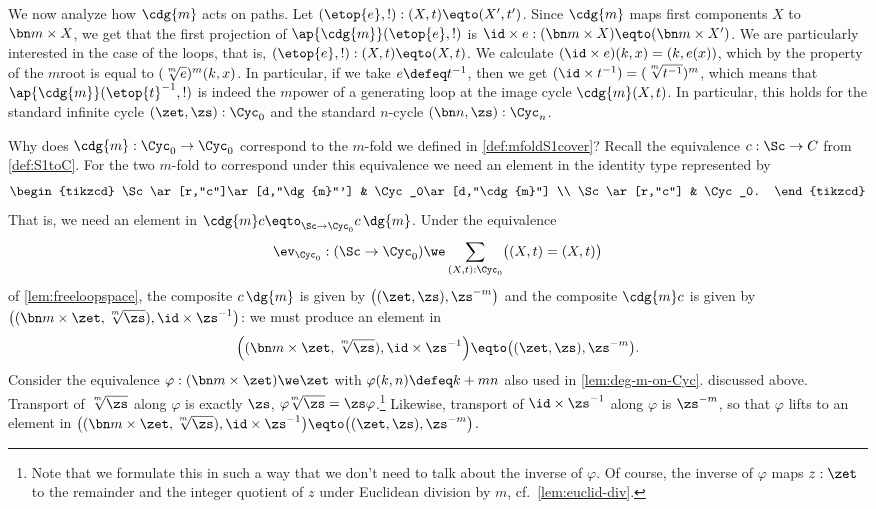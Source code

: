 We now analyze how $\cdg{m}$ acts on paths.
Let $({\etop{e}},{!}):(X,t)\eqto(X',t')$.
Since $\cdg{m}$ maps first components $X$ to $\bn m\times X$, we get that
the first projection of $\ap{\cdg{m}}({\etop{e}},{!})$ is
${\id\times e} : (\bn m\times X)\eqto(\bn m\times X')$.
We are particularly interested in the case of the loops,
that is, $({\etop{e}},{!}):(X,t)\eqto(X,t)$.
We calculate $(\id\times e)(k,x) = (k,e(x))$,
which by the property of the $m$\th root is equal to $(\sqrt[\uproot{2}m]e)^m(k,x)$.
In particular, if we take $e\defeq t^{-1}$,
then we get $(\id\times t^{-1}) = (\sqrt[\uproot{2}m]{t^{-1}})^m$, which means that
$\ap{\cdg{m}}({\etop{t}^{-1}},{!})$ is indeed the $m$\th power of a
generating loop at the image cycle $\cdg{m}(X,t)$.
In particular, this holds for the standard infinite cycle $(\zet,\zs):\Cyc_0$
and the standard $n$-cycle $(\bn n,\zs):\Cyc_n$.

Why does $\cdg{m}:\Cyc_0\to\Cyc_0$
correspond to the $m$-fold \covering we defined in \cref{def:mfoldS1cover}?
Recall the equivalence $c:\Sc\to C$ from \cref{def:S1toC}.
For the two $m$-fold \coverings to correspond under this equivalence
we need an element in the identity type represented by
\[
  \begin{tikzcd}
    \Sc\ar[r,"c"]\ar[d,"\dg{m}"'] & \Cyc_0\ar[d,"\cdg{m}"] \\
    \Sc\ar[r,"c"] & \Cyc_0.
  \end{tikzcd}
\]
That is, we need an element in $\cdg{m}c\eqto_{\Sc\to\Cyc_0}c\,\dg{m}$.
Under the equivalence
\[
  \ev_{\Cyc_0}:(\Sc\to\Cyc_0)\we \sum_{(X,t):\Cyc_0}\bigl((X,t)=(X,t)\bigr)
\]
of \cref{lem:freeloopspace},
the composite $c\,\dg{m}$ is given by $\bigl((\zet,\zs),\zs^{-m}\bigr)$
and the composite $\cdg{m}c$ is given by
$\bigl((\bn m\times\zet,\sqrt[\uproot{2}m]{\zs}),\id\times\zs^{-1}\bigr)$:
we must produce an element in
\[
  \Bigl((\bn m\times\zet,\sqrt[\uproot{2}m]{\zs}),\id\times\zs^{-1}\Bigr)
  \eqto \bigl((\zet,\zs),\zs^{-m}\bigr).
\]
Consider the equivalence  $\varphi: (\bn m\times \zet)\we\zet$ with $\varphi(k,n)\defeq k+mn$
also used in \cref{lem:deg-m-on-Cyc}. discussed above.
Transport of $\sqrt[\uproot{2}m]\zs$ along $\varphi$ is exactly $\zs$,
\ie $\varphi\!\sqrt[\uproot{2}m]\zs=\zs\varphi$.\footnote{%
Note that we formulate this in such a way that we don't need to talk about the inverse of $\varphi$.
Of course, the inverse of $\varphi$ maps $z:\zet$ to the remainder and the integer quotient of $z$
under Euclidean division by $m$, cf.~\cref{lem:euclid-div}.}
Likewise, transport of $\id\times\zs^{-1}$ along $\varphi$ is $\zs^{-m}$,
so that $\varphi$ lifts to an element in
$\bigl((\bn m\times\zet,\sqrt[\uproot{2}m]{\zs}), \id\times\zs^{-1}\bigr)
\eqto \bigl((\zet,\zs),\zs^{-m}\bigr)$.

